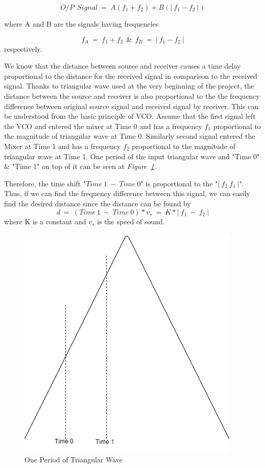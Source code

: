 \documentclass[paper]{IEEEtran}
\begin{document}
	$$ O/P~~ Signal ~=~ A(f_1+f_2) + B(|~f_1 -f_2~|)  $$
	
	where A and B are the signals having frequencies  
	
	$$ f_A ~= ~ f_1+f_2~~ \&~~ f_B~=~|~f_1 -f_2~| $$ respectively.
	
	We know that the distance between source and receiver causes a time delay proportional to the distance for the received signal in comparison to the received signal. Thanks to triangular wave used at the very beginning of the project, the distance between the source and receiver is also proportional to the the frequency difference between original source signal and received signal by receiver. This can be understood from the basic principle of VCO. Assume that the first signal left the VCO and entered the mixer at Time 0 and has a frequency $f_1$ proportional to the magnitude of triangular wave at Time 0. Similarly second signal entered the Mixer at Time 1 and has a frequency $f_2$ proportional to the magnitude of triangular wave at Time 1. One period of the input triangular wave and "Time 0" \& "Time 1" on top of it can be seen at \textit{Figure~\ref{fig:trimix}}. 
	
	Therefore, the time shift "$Time~1~-~Time~0$" is proportional to the "$|~f_2~f_1~|$". Thus, if we can find the frequency difference between this signal, we can easily find the desired distance since the distance can be found by
	$$ d~=~(Time~1~-~Time~0)*v_s~=~K*|~f_1~-~f_2~|$$ 
	where K is a constant and $v_s$ is the speed of sound.
	
\begin{figure}[h!]
\setlength{\unitlength}{\textwidth}
\center 
\includegraphics[width=0.25\unitlength]{triangular.png}
\caption{\label{fig:trimix}One Period of Triangular Wave }
\end{figure}	
\end{document}
